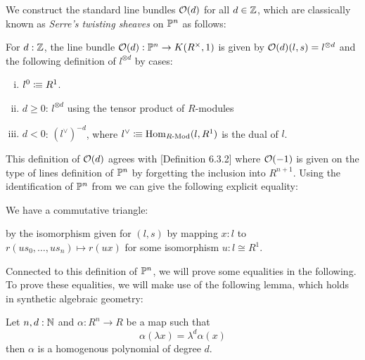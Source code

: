 We construct the standard line bundles $\mathcal{O}(d)$ for all $d\in\mathbb{Z}$,
which are classically known as \emph{Serre's twisting sheaves} on $\mathbb{P}^n$ as follows:

\begin{definition}
  For $d:\mathbb{Z}$, the line bundle $\mathcal{O}(d):\mathbb{P}^n\to K(R^{\times},1)$ is given by $\mathcal{O}(d)(l,s) = l^{\otimes d}$
  and the following definition of $l^{\otimes d}$ by cases:
  \begin{enumerate}[(i)]
  \item $l^0\vcentcolon\mspace{-1.2mu}\equiv R^1$.
  \item $d \geqslant 0$: $l^{\otimes d}$ using the tensor product of $R$-modules
  \item $d < 0$: $(l^{\vee})^{-d}$, where $l^{\vee}\vcentcolon\mspace{-1.2mu}\equiv\mathrm{Hom}_{R\text{-}\mathrm{Mod}}(l,R^1)$ is the dual of $l$.
  \end{enumerate}
\end{definition}

This definition of $\mathcal{O}(d)$ agrees with \cite{draft}[Definition 6.3.2] where $\mathcal{O}(-1)$
is given on the type of lines definition of $\mathbb{P}^n$ by forgetting the inclusion into $R^{n+1}$.
Using the identification of $\mathbb{P}^n$ from  we can give the following explicit equality:

\begin{remark}
  We have a commutative triangle:
  \begin{center}
  \end{center}

by the isomorphism given for $(l,s)$ by mapping $x:l$ to $r(u s_0,\dots, u s_n)\mapsto r(u x)$ for some isomorphism $u:l\cong R^1$.
\end{remark}

\medskip

 Connected to this definition of $\mathbb{P}^n$, we will prove some equalities in the following.
 To prove these equalities, we will make use of the following lemma, which holds in synthetic algebraic geometry:
 
\begin{lemma}\label{invariant-implies-homogenous}
  Let $n,d:\mathbb{N}$ and $\alpha:R^n\to R$ be a map such that
  \[\alpha(\lambda x)=\lambda^d\alpha(x)\]
  then $\alpha$ is a homogenous polynomial of degree $d$.
\end{lemma}

